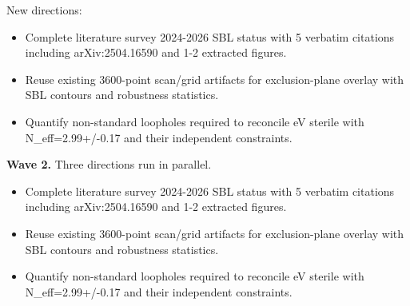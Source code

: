 \documentclass[11pt,a4paper]{article}
\begin{document}
New directions:

\begin{itemize}
  \item Complete literature survey 2024-2026 SBL status with 5 verbatim citations including arXiv:2504.16590 and 1-2 extracted figures.
  \item Reuse existing 3600-point scan/grid artifacts for exclusion-plane overlay with SBL contours and robustness statistics.
  \item Quantify non-standard loopholes required to reconcile eV sterile with N\_eff=2.99+/-0.17 and their independent constraints.
\end{itemize}
\textbf{Wave 2.} Three directions run in parallel.

\begin{itemize}
  \item Complete literature survey 2024-2026 SBL status with 5 verbatim citations including arXiv:2504.16590 and 1-2 extracted figures.
  \item Reuse existing 3600-point scan/grid artifacts for exclusion-plane overlay with SBL contours and robustness statistics.
  \item Quantify non-standard loopholes required to reconcile eV sterile with N\_eff=2.99+/-0.17 and their independent constraints.
\end{itemize}
\end{document}
